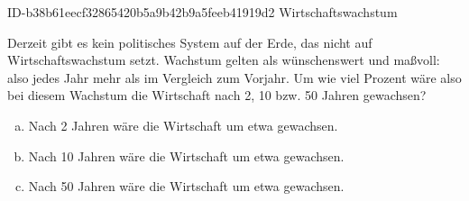 \begin{exercise}
      {ID-b38b61eecf32865420b5a9b42b9a5feeb41919d2}
      {Wirtschaftswachstum}
  \ifproblem\problem\par
    Derzeit gibt es kein politisches System auf der Erde, das nicht
    auf Wirtschaftswachstum setzt.  Wachstum gelten als
    wünschenswert und maßvoll: also jedes Jahr  mehr als im
    Vergleich zum Vorjahr. Um wie viel Prozent wäre also bei diesem
    Wachstum die Wirtschaft nach 2, 10 bzw. 50 Jahren gewachsen?
  \fi
  \ifoutcome\outcome\par
    \begin{enumerate}[a)]
      \item Nach 2  Jahren wäre die Wirtschaft um etwa  gewachsen.
      \item Nach 10 Jahren wäre die Wirtschaft um etwa  gewachsen.
      \item Nach 50 Jahren wäre die Wirtschaft um etwa  gewachsen.
    \end{enumerate}
  \fi
\end{exercise}
